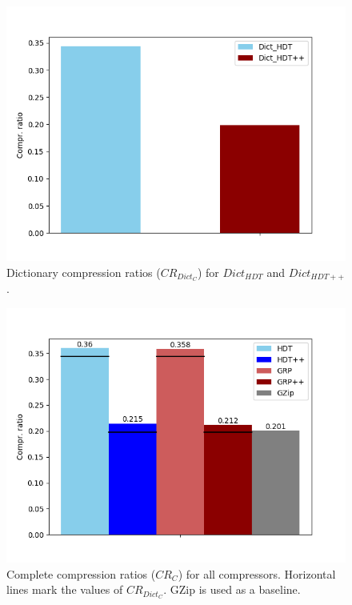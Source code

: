 \begin{figure}
	\centering
	\includegraphics[width=0.8\linewidth]{figures/4_evaluation/final/dictcompr}
	\caption{Dictionary compression ratios ($CR_{Dict_C}$) for $Dict_{HDT}$ and $Dict_{HDT++}$.}
	\label{fig:dictcompr}
\end{figure}





\begin{figure}
	\centering
	\includegraphics[width=0.8\linewidth]{figures/4_evaluation/final/completecompr}
	\caption{Complete compression ratios ($CR_C$) for all compressors. Horizontal lines mark the values of $CR_{Dict_C}$. GZip is used as a baseline.}
	\label{fig:completecompr}
\end{figure}
















